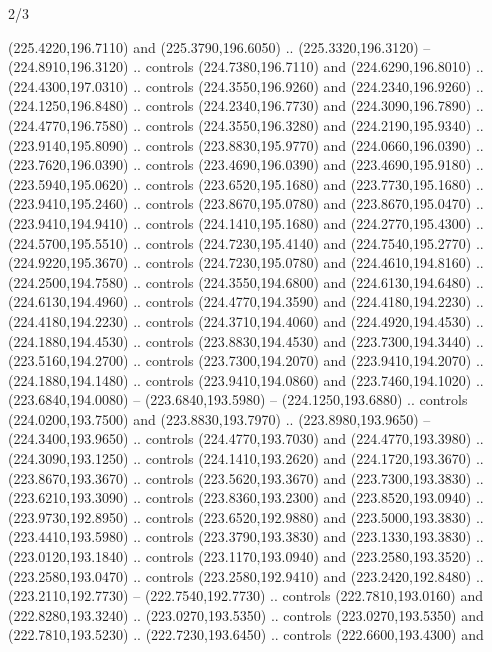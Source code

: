 \begin{flagdescription}{2/3}
\begin{scope}[xshift=0.5\flaglength,yshift=0.5\flagwidth,scale=\flagwidth/259.2]
\begin{scope}[y=0.8pt, x=0.8pt, yscale=-1,shift={(-243,-162)}]
      (225.4220,196.7110) and (225.3790,196.6050) .. (225.3320,196.3120) --
      (224.8910,196.3120) .. controls (224.7380,196.7110) and (224.6290,196.8010) ..
      (224.4300,197.0310) .. controls (224.3550,196.9260) and (224.2340,196.9260) ..
      (224.1250,196.8480) .. controls (224.2340,196.7730) and (224.3090,196.7890) ..
      (224.4770,196.7580) .. controls (224.3550,196.3280) and (224.2190,195.9340) ..
      (223.9140,195.8090) .. controls (223.8830,195.9770) and (224.0660,196.0390) ..
      (223.7620,196.0390) .. controls (223.4690,196.0390) and (223.4690,195.9180) ..
      (223.5940,195.0620) .. controls (223.6520,195.1680) and (223.7730,195.1680) ..
      (223.9410,195.2460) .. controls (223.8670,195.0780) and (223.8670,195.0470) ..
      (223.9410,194.9410) .. controls (224.1410,195.1680) and (224.2770,195.4300) ..
      (224.5700,195.5510) .. controls (224.7230,195.4140) and (224.7540,195.2770) ..
      (224.9220,195.3670) .. controls (224.7230,195.0780) and (224.4610,194.8160) ..
      (224.2500,194.7580) .. controls (224.3550,194.6800) and (224.6130,194.6480) ..
      (224.6130,194.4960) .. controls (224.4770,194.3590) and (224.4180,194.2230) ..
      (224.4180,194.2230) .. controls (224.3710,194.4060) and (224.4920,194.4530) ..
      (224.1880,194.4530) .. controls (223.8830,194.4530) and (223.7300,194.3440) ..
      (223.5160,194.2700) .. controls (223.7300,194.2070) and (223.9410,194.2070) ..
      (224.1880,194.1480) .. controls (223.9410,194.0860) and (223.7460,194.1020) ..
      (223.6840,194.0080) -- (223.6840,193.5980) -- (224.1250,193.6880) .. controls
      (224.0200,193.7500) and (223.8830,193.7970) .. (223.8980,193.9650) --
      (224.3400,193.9650) .. controls (224.4770,193.7030) and (224.4770,193.3980) ..
      (224.3090,193.1250) .. controls (224.1410,193.2620) and (224.1720,193.3670) ..
      (223.8670,193.3670) .. controls (223.5620,193.3670) and (223.7300,193.3830) ..
      (223.6210,193.3090) .. controls (223.8360,193.2300) and (223.8520,193.0940) ..
      (223.9730,192.8950) .. controls (223.6520,192.9880) and (223.5000,193.3830) ..
      (223.4410,193.5980) .. controls (223.3790,193.3830) and (223.1330,193.3830) ..
      (223.0120,193.1840) .. controls (223.1170,193.0940) and (223.2580,193.3520) ..
      (223.2580,193.0470) .. controls (223.2580,192.9410) and (223.2420,192.8480) ..
      (223.2110,192.7730) -- (222.7540,192.7730) .. controls (222.7810,193.0160) and
      (222.8280,193.3240) .. (223.0270,193.5350) .. controls (223.0270,193.5350) and
      (222.7810,193.5230) .. (222.7230,193.6450) .. controls (222.6600,193.4300) and

\end{scope}
\end{scope}
\end{flagdescription}
